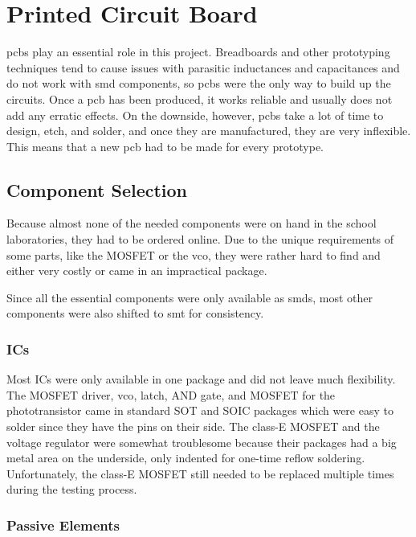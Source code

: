 \setchapterpreamble[u]{\margintoc}

\chapter{Printed Circuit Board}

\glspl{pcb} play an essential role in this project. Breadboards and other prototyping techniques tend to cause issues with parasitic inductances and capacitances and do not work with \gls{smd} components, so \glspl{pcb} were the only way to build up the circuits. Once a \gls{pcb} has been produced, it works reliable and usually does not add any erratic effects. On the downside, however, \glspl{pcb} take a lot of time to design, etch, and solder, and once they are manufactured, they are very inflexible. This means that a new \gls{pcb} had to be made for every prototype.

\section{Component Selection}

Because almost none of the needed components were on hand in the school laboratories, they had to be ordered online. Due to the unique requirements of some parts, like the MOSFET or the \gls{vco}, they were rather hard to find and either very costly or came in an impractical package.

Since all the essential components were only available as \glspl{smd}, most other components were also shifted to \gls{smt} for consistency.


\subsection{ICs}

Most ICs were only available in one package and did not leave much flexibility. The MOSFET driver, \gls{vco}, latch, AND gate, and MOSFET for the phototransistor came in standard SOT and SOIC packages which were easy to solder since they have the pins on their side. The class-E MOSFET and the voltage regulator were somewhat troublesome because their packages had a big metal area on the underside, only indented for one-time reflow soldering. Unfortunately, the class-E MOSFET still needed to be replaced multiple times during the testing process. %

\subsection{Passive Elements}

